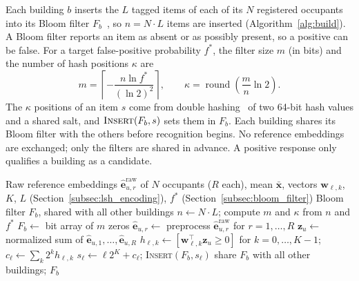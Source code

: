 \documentclass[pdflatex,sn-mathphys-num]{sn-jnl}%
\theoremstyle{thmstyleone}%
\theoremstyle{thmstyletwo}%
\theoremstyle{thmstylethree}%
\begin{document}
Each building $b$ inserts the $L$ tagged items of each of its $N$ registered occupants into its Bloom filter $F_b$~\cite{bloom1970}, so $n=N\cdot L$ items are inserted (Algorithm~\ref{alg:build}). A Bloom filter reports an item as absent or as possibly present, so a positive can be false. For a target false-positive probability $f^*$, the filter size $m$ (in bits) and the number of hash positions $\kappa$ are
\begin{equation}
    m =
    \left\lceil
    -\frac{n\ln f^*}{(\ln 2)^2}
    \right\rceil,
    \qquad
    \kappa =
    \operatorname{round}
    \left(\frac{m}{n}\ln 2\right).
    \label{eq:bloom_size}
\end{equation}
The $\kappa$ positions of an item $s$ come from double hashing~\cite{kirsch2006} of two 64-bit hash values and a shared salt, and $\textsc{Insert}(F_b,s)$ sets them in $F_b$. Each building shares its Bloom filter with the others before recognition begins. No reference embeddings are exchanged; only the filters are shared in advance. A positive response only qualifies a building as a candidate.

\begin{algorithm}[!t]
\footnotesize
\caption{LSH encoding and Bloom-filter construction at building $b$}
\label{alg:build}
\begin{algorithmic}[1]
\Require Raw reference embeddings $\hat{\mathbf{e}}^{\mathrm{raw}}_{u,r}$ of $N$ occupants ($R$ each), mean $\bar{\mathbf{x}}$, vectors $\mathbf{w}_{\ell,k}$, $K$, $L$ (Section~\ref{subsec:lsh_encoding}), $f^*$ (Section~\ref{subsec:bloom_filter})
\Ensure Bloom filter $F_b$, shared with all other buildings
\State $n\gets N\cdot L$; compute $m$ and $\kappa$ from $n$ and $f^*$ 
\State $F_b\gets$ bit array of $m$ zeros
  \State $\hat{\mathbf{e}}_{u,r}\gets$ preprocess $\hat{\mathbf{e}}^{\mathrm{raw}}_{u,r}$ for $r=1,\dots,R$ 
  \State $\mathbf{z}_u\gets$ normalized sum of $\hat{\mathbf{e}}_{u,1},\dots,\hat{\mathbf{e}}_{u,R}$ 
    \State $h_{\ell,k}\gets[\mathbf{w}_{\ell,k}^\top\mathbf{z}_u\geq 0]$ for $k=0,\dots,K-1$; $c_\ell\gets\sum_{k}2^{k}h_{\ell,k}$ 
    \State $s_\ell\gets\ell 2^K+c_\ell$; \textsc{Insert}$(F_b,s_\ell)$ 
  \EndFor
\EndFor
\State share $F_b$ with all other buildings; \Return $F_b$
\end{algorithmic}
\end{algorithm}
\end{document}
